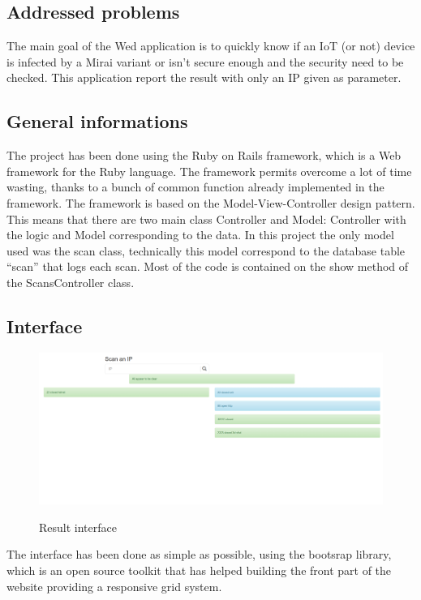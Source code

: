 \documentclass{report}
\begin{document}
\subsection{Addressed problems}
The main goal of the Wed application is to quickly know if an IoT (or not) device is infected by a Mirai variant or isn't secure enough and the security need to be checked. This application report the result with only an IP given as parameter.

\subsection{General informations}
The project has been done using the Ruby on Rails framework, which is a Web framework for the Ruby language. The framework permits overcome a lot of time wasting, thanks to a bunch of common function already implemented in the framework. The framework is based on the Model-View-Controller design pattern. This means that there are two main class Controller and Model: Controller with the logic and Model corresponding to the data. In this project the only model used was the scan class, technically this model correspond to the database table ``scan'' that logs each scan. Most of the code is contained on the show method of the ScansController class.

\subsection{Interface}
\begin{figure}[h]
 \caption{Result interface}
 \centering
 \includegraphics[width=1.3\textwidth]{./img/vulweb-result}
 \label{fig:screen-act}
\end{figure}
The interface has been done as simple as possible, using the bootsrap library\autocite{bootstrap}, which is an open source toolkit that has helped building the front part of the website providing a responsive grid system.
\end{document}
